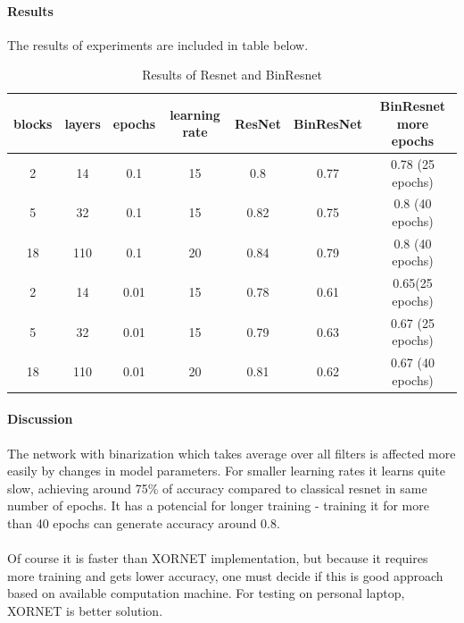 \documentclass[licencjacka]{pracamgr}
\begin{document}
		        \paragraph{Results} 
		        The results of experiments are included in table below.
		        \begin{table}[H]
		                        \caption{Results of Resnet and BinResnet}
		                        \centering
		                        \begin{tabular}{c c c c c c c}
		                        \hline\hline
		                        blocks & layers & epochs & learning rate & ResNet & BinResNet & BinResnet more epochs  \\ [0.5ex]
		                        \hline
		                                2 & 14  & 0.1   & 15 & 0.8 & 0.77 & 0.78 (25 epochs) \\
		                                5 & 32  & 0.1   & 15 & 0.82 & 0.75 & 0.8 (40 epochs) \\
		                                18      & 110 & 0.1     & 20 & 0.84 & 0.79 & 0.8 (40 epochs)\\
		                        \hline
		                                2 & 14  & 0.01  & 15 & 0.78 & 0.61 & 0.65(25 epochs) \\
		                                5 & 32  & 0.01  & 15 & 0.79 & 0.63 & 0.67 (25 epochs) \\
		                                18 & 110 & 0.01 & 20 & 0.81 & 0.62 & 0.67 (40 epochs) \\
		                        \hline
		                        \end{tabular}
		                        \label{table:nonlin}
		        \end{table}

		        \paragraph{Discussion} 
		                The network with binarization which takes average over all filters is affected more easily by changes in model parameters. For smaller learning rates it learns quite slow, achieving around 75\% of accuracy compared to classical resnet in same number of epochs. It has a potencial for longer training - training it for more than 40 epochs can generate accuracy around 0.8. 
		                \\\\
		                Of course it is faster than XORNET implementation, but because it requires more training and gets lower accuracy, one must decide if this is good approach based on available computation machine. For testing on personal laptop, XORNET is better solution.
\end{document}
